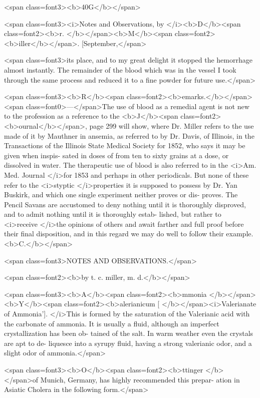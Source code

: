 <span class=font3><b>40G</b></span>

<span class=font3><i>Notes and Observations, by </i><b>D</b><span class=font2><b>r. </b></span><b>M</b><span class=font2><b>iller</b></span>. [September,</span>

<span class=font3>its place, and to my great delight it stopped the hemorrhage almost
instantly. The remainder of the blood which was in the vessel I took
through the same process and reduced it to a fine powder for future use.</span>

<span class=font3><b>R</b><span class=font2><b>emarks.</b></span><span class=font0>---</span>The use of blood as a remedial agent is not new to the
profession as a reference to the <b>J</b><span class=font2><b>ournal</b></span>, page 299 will show, where
Dr. Miller refers to the use made of it by Mauthner in ansemia, as
referred to by Dr. Davis, of Illinois, in the Transactions of the Illinois
State Medical Society for 1852, who says it may be given when inspis-
sated in doses of from ten to sixty grains at a dose, or dissolved in
water. The therapeutic use of blood is also referred to in the <i>Am.
Med. Journal </i>for 1853 and perhaps in other periodicals. But none of
these refer to the <i>styptic </i>properties it is supposed to possess by Dr.
Yan Buskirk, and which one single experiment neither proves or dis-
proves. The Pencil Savans are accustomed to deny nothing until it is
thoroughly disproved, and to admit nothing until it is thoroughly estab-
lished, but rather to <i>receive </i>the opinions of others and await farther
and full proof before their final disposition, and in this regard we may
do well to follow their example. <b>C.</b></span>

<span class=font3>NOTES AND OBSERVATIONS.</span>

<span class=font2><b>by t. c. miller, m. d.</b></span>

<span class=font3><b>A</b><span class=font2><b>mmonia </b></span><b>Y</b><span class=font2><b>alerianicum [ </b></span><i>Valerianate of Ammonia']. </i>This is formed
by the saturation of the Valerianic acid with the carbonate of ammonia.
It is usually a fluid, although an imperfect crystallization has been ob-
tained of the salt. In warm weather even the crystals are apt to de-
liquesce into a syrupy fluid, having a strong valerianic odor, and a
slight odor of ammonia.</span>

<span class=font3><b>O</b><span class=font2><b>ttinger </b></span>of Munich, Germany, has highly recommended this prepar-
ation in Asiatic Cholera in the following form.</span>

